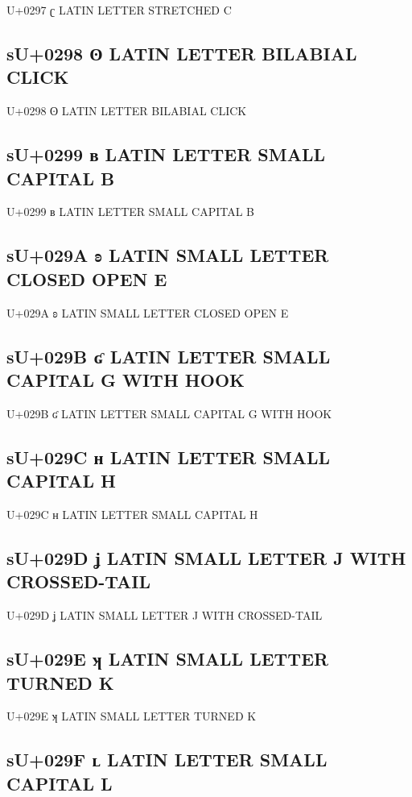 U+0297 ʗ LATIN LETTER STRETCHED C

\subsection{sU+0298 ʘ LATIN LETTER BILABIAL CLICK}

U+0298 ʘ LATIN LETTER BILABIAL CLICK

\subsection{sU+0299 ʙ LATIN LETTER SMALL CAPITAL B}

U+0299 ʙ LATIN LETTER SMALL CAPITAL B

\subsection{sU+029A ʚ LATIN SMALL LETTER CLOSED OPEN E}

U+029A ʚ LATIN SMALL LETTER CLOSED OPEN E

\subsection{sU+029B ʛ LATIN LETTER SMALL CAPITAL G WITH HOOK}

U+029B ʛ LATIN LETTER SMALL CAPITAL G WITH HOOK

\subsection{sU+029C ʜ LATIN LETTER SMALL CAPITAL H}

U+029C ʜ LATIN LETTER SMALL CAPITAL H

\subsection{sU+029D ʝ LATIN SMALL LETTER J WITH CROSSED-TAIL}

U+029D ʝ LATIN SMALL LETTER J WITH CROSSED-TAIL

\subsection{sU+029E ʞ LATIN SMALL LETTER TURNED K}

U+029E ʞ LATIN SMALL LETTER TURNED K

\subsection{sU+029F ʟ LATIN LETTER SMALL CAPITAL L}


